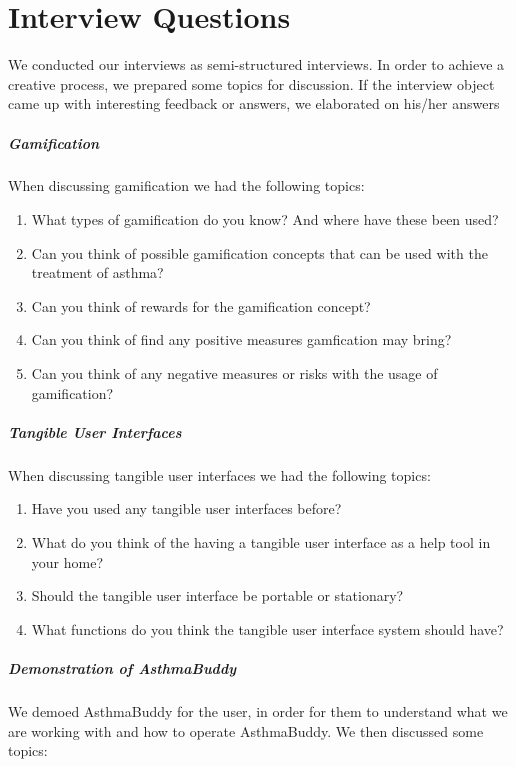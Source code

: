 \chapter{Interview Questions}
\label{app:interviewquestions}


We conducted our interviews as semi-structured interviews. In order to achieve a creative process, we prepared some topics for discussion. If the interview object came up with interesting feedback or answers, we elaborated on his/her answers


\paragraph{Gamification}
When discussing gamification we had the following topics:

\begin{enumerate}
	\item{What types of gamification do you know? And where have these been used?}
	\item{Can you think of possible gamification concepts that can be used with the treatment of asthma?}
	\item{Can you think of rewards for the gamification concept?}
	\item{Can you think of find any positive measures gamfication may bring?}
	\item{Can you think of any negative measures or risks with the usage of gamification?}
\end{enumerate}


\paragraph{Tangible User Interfaces}
When discussing tangible user interfaces we had the following topics:

\begin{enumerate}
	\item{Have you used any tangible user interfaces before?}
	\item{What do you think of the having a tangible user interface as a help tool in your home?}
	\item{Should the tangible user interface be portable or stationary?}
	\item{What functions do you think the tangible user interface system should have?}
\end{enumerate}


\paragraph{Demonstration of AsthmaBuddy}
We demoed AsthmaBuddy for the user, in order for them to understand what we are working with and how to operate AsthmaBuddy. We then discussed some topics:

